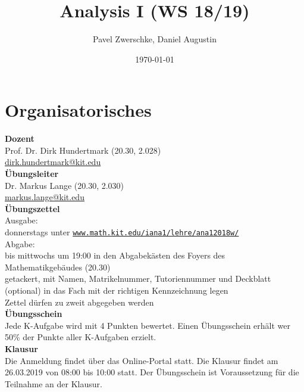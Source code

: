 \documentclass[12pt,a4paper,titlepage]{article} %
\theoremstyle{definition}
\theoremstyle{remark}
\begin{document}
\title{Analysis I (WS 18/19)}
\date{\today}
\author{Pavel Zwerschke, Daniel Augustin}
\maketitle

\tableofcontents
\newpage

\setcounter{section}{-1}
\section{Organisatorisches}
\textbf{Dozent}\\
Prof. Dr. Dirk Hundertmark (20.30, 2.028)\\
\href{mailto:dirk.hundertmark@kit.edu}{dirk.hundertmark@kit.edu}\\
\textbf{Übungsleiter}\\
Dr. Markus Lange (20.30, 2.030)\\
\href{mailto:markus.lange@kit.edu}{markus.lange@kit.edu}\\
\textbf{Übungszettel}\\
Ausgabe:\\
donnerstags unter \href{http://www.math.kit.edu/iana1/lehre/ana12018w/}{\texttt{www.math.kit.edu/iana1/lehre/ana12018w/}}\\
Abgabe:\\
bis mittwochs um 19:00 in den Abgabekästen des Foyers des Mathematikgebäudes (20.30)\\
getackert, mit Namen, Matrikelnummer, Tutoriennummer und Deckblatt (optional) in das Fach mit der richtigen Kennzeichnung legen\\
Zettel dürfen zu zweit abgegeben werden\\
\textbf{Übungsschein}\\
Jede K-Aufgabe wird mit 4 Punkten bewertet. Einen Übungsschein erhält wer 50\% der Punkte aller K-Aufgaben erzielt.\\
\textbf{Klausur}\\
Die Anmeldung findet über das Online-Portal statt. Die Klausur findet am 26.03.2019 von 08:00 bis 10:00 statt. Der Übungsschein ist Voraussetzung für die Teilnahme an der Klausur.

\newpage
\end{document}
